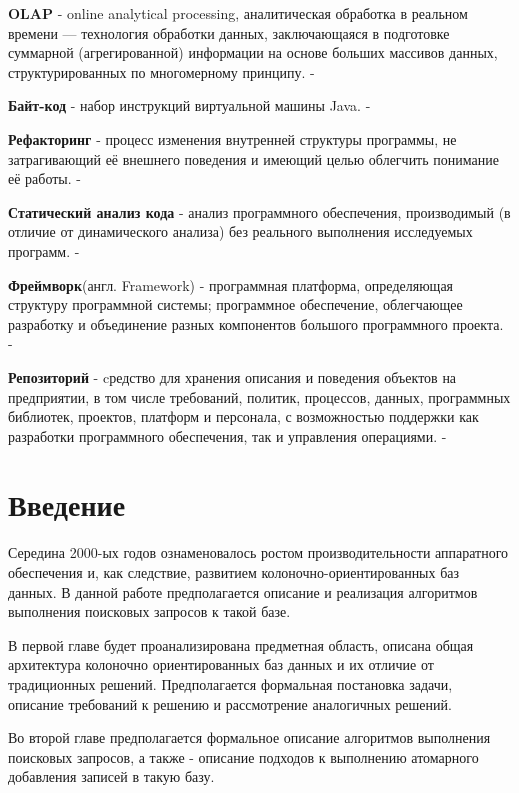 \documentclass{matmex-diploma}
\begin{document}
    \textbf{OLAP} - online analytical processing, аналитическая обработка в реальном времени — технология обработки данных, заключающаяся в подготовке суммарной (агрегированной) информации на основе больших массивов данных, структурированных по многомерному принципу. - \cite{gartner}
    
    \textbf{Байт-код} - набор инструкций виртуальной машины Java. - \cite{jvm:spec}
    
    \textbf{Рефакторинг} - процесс изменения внутренней структуры программы, не затрагивающий её внешнего поведения и имеющий целью облегчить понимание её работы. - \cite{fowler}
    
    \textbf{Статический анализ кода} - анализ программного обеспечения, производимый (в отличие от динамического анализа) без реального выполнения исследуемых программ. - \cite{wichmann1995industrial}
    
    \textbf{Фреймворк}(англ. Framework) - программная платформа, определяющая структуру программной системы; программное обеспечение, облегчающее разработку и объединение разных компонентов большого программного проекта. - \cite{wiki:framework}
    
    \textbf{Репозиторий} - cредство для хранения описания и поведения объектов на предприятии, в том числе требований, политик, процессов, данных, программных библиотек, проектов, платформ и персонала, с возможностью поддержки как разработки программного обеспечения, так и управления операциями. - \cite{gartner}
    
\section*{Введение}
    Середина 2000-ых годов ознаменовалось ростом производительности аппаратного обеспечения и, как следствие, развитием колоночно-ориентированных баз данных. В данной работе предполагается описание и реализация алгоритмов выполнения поисковых запросов к такой базе.
    
    В первой главе будет проанализирована предметная область, описана общая архитектура колоночно ориентированных баз данных и их отличие от традиционных решений. Предполагается формальная постановка задачи, описание требований к решению и рассмотрение аналогичных решений.
    
    Во второй главе предполагается формальное описание алгоритмов выполнения поисковых запросов, а также - описание подходов к выполнению атомарного добавления записей в такую базу.
    
\end{document}
